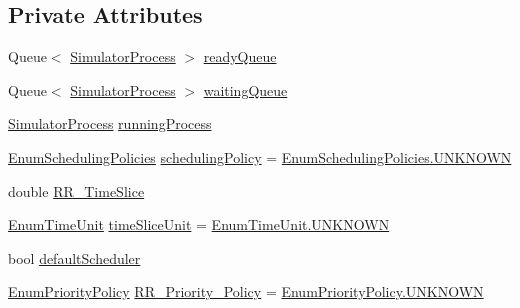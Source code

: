 \subsection*{Private Attributes}
\begin{DoxyCompactItemize}
\item 
Queue$<$ \hyperlink{class_c_p_u___o_s___simulator_1_1_operating___system_1_1_simulator_process}{Simulator\+Process} $>$ \hyperlink{class_c_p_u___o_s___simulator_1_1_operating___system_1_1_scheduler_a6583fdeac6a6c0cc5be94ae0f280eaf2}{ready\+Queue}
\item 
Queue$<$ \hyperlink{class_c_p_u___o_s___simulator_1_1_operating___system_1_1_simulator_process}{Simulator\+Process} $>$ \hyperlink{class_c_p_u___o_s___simulator_1_1_operating___system_1_1_scheduler_abc9ae70e3bbda89777732cafa895bbdf}{waiting\+Queue}
\item 
\hyperlink{class_c_p_u___o_s___simulator_1_1_operating___system_1_1_simulator_process}{Simulator\+Process} \hyperlink{class_c_p_u___o_s___simulator_1_1_operating___system_1_1_scheduler_a550642f62d310086e58eda71acfdd085}{running\+Process}
\item 
\hyperlink{namespace_c_p_u___o_s___simulator_1_1_operating___system_ad0cdaacf9652394d23fa29109640fe08}{Enum\+Scheduling\+Policies} \hyperlink{class_c_p_u___o_s___simulator_1_1_operating___system_1_1_scheduler_a5a0194d8bb0127f6a8c010241d9ccb42}{scheduling\+Policy} = \hyperlink{namespace_c_p_u___o_s___simulator_1_1_operating___system_aea0b669d1bbf5690ae34ac2f8bef9470a696b031073e74bf2cb98e5ef201d4aa3}{Enum\+Scheduling\+Policies.\+U\+N\+K\+N\+O\+W\+N}
\item 
double \hyperlink{class_c_p_u___o_s___simulator_1_1_operating___system_1_1_scheduler_adb134e5a535b1051503d0ee7d3f733f1}{R\+R\+\_\+\+Time\+Slice}
\item 
\hyperlink{namespace_c_p_u___o_s___simulator_1_1_operating___system_a0553d0bc2513aec52caa769acf994d5c}{Enum\+Time\+Unit} \hyperlink{class_c_p_u___o_s___simulator_1_1_operating___system_1_1_scheduler_a0622698ea0dc65d42250dae5787846fd}{time\+Slice\+Unit} = \hyperlink{namespace_c_p_u___o_s___simulator_1_1_operating___system_aea0b669d1bbf5690ae34ac2f8bef9470a696b031073e74bf2cb98e5ef201d4aa3}{Enum\+Time\+Unit.\+U\+N\+K\+N\+O\+W\+N}
\item 
bool \hyperlink{class_c_p_u___o_s___simulator_1_1_operating___system_1_1_scheduler_afe8019eea4f52f2bd30c40c0ae576eac}{default\+Scheduler}
\item 
\hyperlink{namespace_c_p_u___o_s___simulator_1_1_operating___system_a3a9286a473bd079e9c65908c0378fa00}{Enum\+Priority\+Policy} \hyperlink{class_c_p_u___o_s___simulator_1_1_operating___system_1_1_scheduler_a9eba9301a8f7983c1b8d55c479ce4760}{R\+R\+\_\+\+Priority\+\_\+\+Policy} = \hyperlink{namespace_c_p_u___o_s___simulator_1_1_operating___system_aea0b669d1bbf5690ae34ac2f8bef9470a696b031073e74bf2cb98e5ef201d4aa3}{Enum\+Priority\+Policy.\+U\+N\+K\+N\+O\+W\+N}

\end{DoxyCompactItemize}
